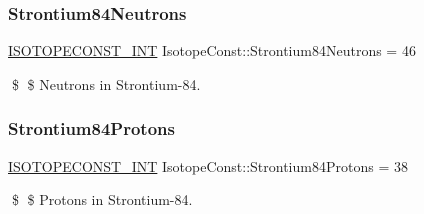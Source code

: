 \subsubsection{\texorpdfstring{Strontium84\+Neutrons}{Strontium84Neutrons}}
{\footnotesize\ttfamily \mbox{\hyperlink{group___isotope_const-_macros_ga5f18360b3e99483a35c32d789e62621c}{I\+S\+O\+T\+O\+P\+E\+C\+O\+N\+S\+T\+\_\+\+I\+NT}} Isotope\+Const\+::\+Strontium84\+Neutrons = 46}

\$ \$ Neutrons in Strontium-\/84. \mbox{\label{group___isotope_const-_strontium-_sr84_ga8e5b70f75b046ea5b5183939821d99d2}} 
\subsubsection{\texorpdfstring{Strontium84\+Protons}{Strontium84Protons}}
{\footnotesize\ttfamily \mbox{\hyperlink{group___isotope_const-_macros_ga5f18360b3e99483a35c32d789e62621c}{I\+S\+O\+T\+O\+P\+E\+C\+O\+N\+S\+T\+\_\+\+I\+NT}} Isotope\+Const\+::\+Strontium84\+Protons = 38}

\$ \$ Protons in Strontium-\/84. 